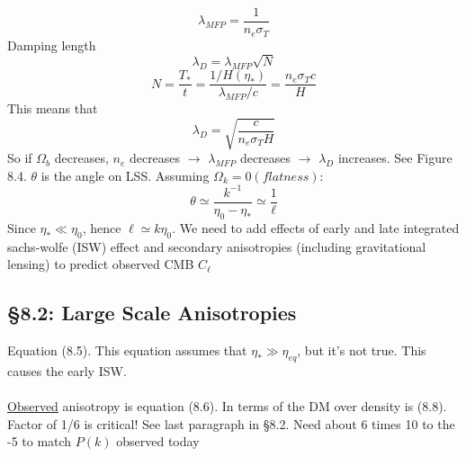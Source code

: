 \documentclass[12pt]{article}
\begin{document}
$$\lambda_{MFP}=\frac{1}{n_e\sigma_T}$$
Damping length
$$\lambda_D=\lambda_{MFP}\sqrt{N}$$
$$N=\frac{T_*}{t}=\frac{1/H(\eta_*)}{\lambda_{MFP}/c}=\frac{n_e\sigma_Tc}{H}$$
This means that
$$\lambda_D=\sqrt{\frac{c}{n_e\sigma_TH}}$$
So if $\Omega_b$ decreases, $n_e$ decreases $\rightarrow$ $\lambda_{MFP}$ decreases $\rightarrow$ $\lambda_D$ increases.  See Figure 8.4.  $\theta$ is the angle on LSS.  Assuming $\Omega_k=0 (flatness):$
$$\theta\simeq\frac{k^{-1}}{\eta_0-\eta_*}\simeq\frac{1}{\ell}$$
Since $\eta_* \ll \eta_0$, hence $\ell \simeq k\eta_0$.  We need to add effects of early and late integrated sachs-wolfe (ISW) effect and secondary anisotropies (including gravitational lensing) to predict observed CMB $C_\ell$
\subsection*{\S8.2: Large Scale Anisotropies}
Equation (8.5).  This equation assumes that $\eta_* \gg \eta_{eq}$, but it's not true.  This causes the early ISW.
\\ \\
\underline{Observed} anisotropy is equation (8.6).  In terms of the DM over density is (8.8).  Factor of 1/6 is critical!  See last paragraph in \S8.2.  Need about 6 times 10 to the -5 to match $P(k)$ observed today
\end{document}
